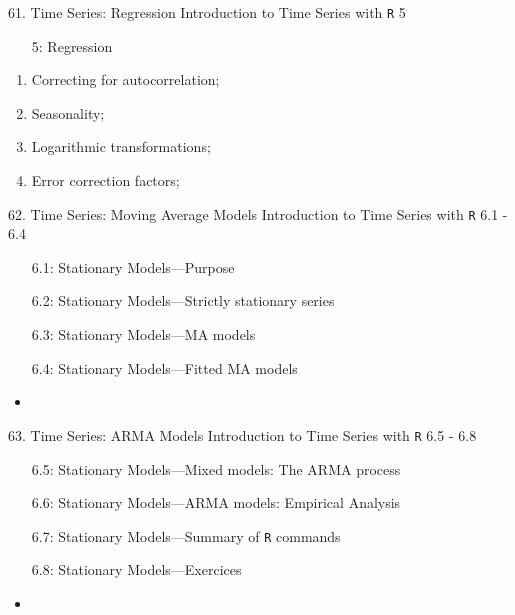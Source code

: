 \documentclass[12pt, titlepage, french]{report}
\begin{document}
\begin{CHPT_SUMM_AUTO}[label = {L.-61}]{61. Time Series: Regression}
Introduction to Time Series with \texttt{R} 5
\begin{itemize}
	\item[5:]	Regression
\end{itemize}
\tcbline
	\begin{enumerate}
		\item	Correcting for autocorrelation;
		\item	Seasonality;
		\item	Logarithmic transformations;
		\item	Error correction factors;
	\end{enumerate}
\end{CHPT_SUMM_AUTO}

\begin{CHPT_SUMM_AUTO}[label = {L.-62}]{62. Time Series: Moving Average Models}
Introduction to Time Series with \texttt{R} 6.1 - 6.4
\begin{itemize}
	\item[6.1:]	Stationary Models---Purpose
	\item[6.2:]	Stationary Models---Strictly stationary series
	\item[6.3:]	Stationary Models---MA models
	\item[6.4:]	Stationary Models---Fitted MA models
\end{itemize}
\tcbline
	\begin{itemize}
		\item	
	\end{itemize}
\end{CHPT_SUMM_AUTO}

\begin{CHPT_SUMM_AUTO}[label = {L.-63}]{63. Time Series: ARMA Models}
Introduction to Time Series with \texttt{R} 6.5 - 6.8
\begin{itemize}
	\item[6.5:]	Stationary Models---Mixed models: The ARMA process
	\item[6.6:]	Stationary Models---ARMA models: Empirical Analysis
	\item[6.7:]	Stationary Models---Summary of \texttt{R} commands
	\item[6.8:]	Stationary Models---Exercices
\end{itemize}
\tcbline
	\begin{itemize}
		\item	
	\end{itemize}
\end{CHPT_SUMM_AUTO}
\end{document}
